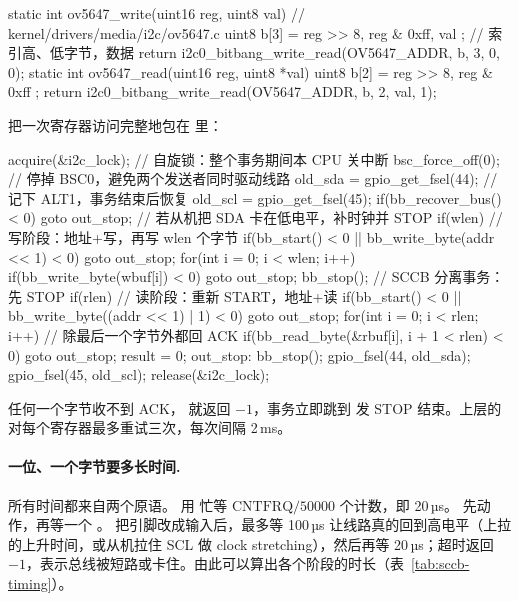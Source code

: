 \begin{ccode}
static int ov5647_write(uint16 reg, uint8 val) {           // kernel/drivers/media/i2c/ov5647.c
  uint8 b[3] = { reg >> 8, reg & 0xff, val };               // 索引高、低字节，数据
  return i2c0_bitbang_write_read(OV5647_ADDR, b, 3, 0, 0);
}
static int ov5647_read(uint16 reg, uint8 *val) {
  uint8 b[2] = { reg >> 8, reg & 0xff };
  return i2c0_bitbang_write_read(OV5647_ADDR, b, 2, val, 1);
}
\end{ccode}

 把一次寄存器访问完整地包在  里：

\begin{ccode}
acquire(&i2c_lock);                     // 自旋锁：整个事务期间本 CPU 关中断
bsc_force_off(0);                       // 停掉 BSC0，避免两个发送者同时驱动线路
old_sda = gpio_get_fsel(44);            // 记下 ALT1，事务结束后恢复
old_scl = gpio_get_fsel(45);
if(bb_recover_bus() < 0) goto out_stop; // 若从机把 SDA 卡在低电平，补时钟并 STOP
if(wlen){                               // 写阶段：地址+写，再写 wlen 个字节
  if(bb_start() < 0 || bb_write_byte(addr << 1) < 0) goto out_stop;
  for(int i = 0; i < wlen; i++)
    if(bb_write_byte(wbuf[i]) < 0) goto out_stop;
  bb_stop();                            // SCCB 分离事务：先 STOP
}
if(rlen){                               // 读阶段：重新 START，地址+读
  if(bb_start() < 0 || bb_write_byte((addr << 1) | 1) < 0) goto out_stop;
  for(int i = 0; i < rlen; i++)         // 除最后一个字节外都回 ACK
    if(bb_read_byte(&rbuf[i], i + 1 < rlen) < 0) goto out_stop;
}
result = 0;
out_stop:
bb_stop();
gpio_fsel(44, old_sda); gpio_fsel(45, old_scl);
release(&i2c_lock);
\end{ccode}

任何一个字节收不到 ACK， 就返回 $-1$，事务立即跳到  发 STOP 结束。上层的  对每个寄存器最多重试三次，每次间隔 2\,ms。

\paragraph{一位、一个字节要多长时间.} 所有时间都来自两个原语。 用  忙等 $\text{CNTFRQ}/50000$ 个计数，即 20\,µs。 先动作，再等一个 。 把引脚改成输入后，最多等 100\,µs 让线路真的回到高电平（上拉的上升时间，或从机拉住 SCL 做 clock stretching），然后再等 20\,µs；超时返回 $-1$，表示总线被短路或卡住。由此可以算出各个阶段的时长（表~\ref{tab:sccb-timing}）。

